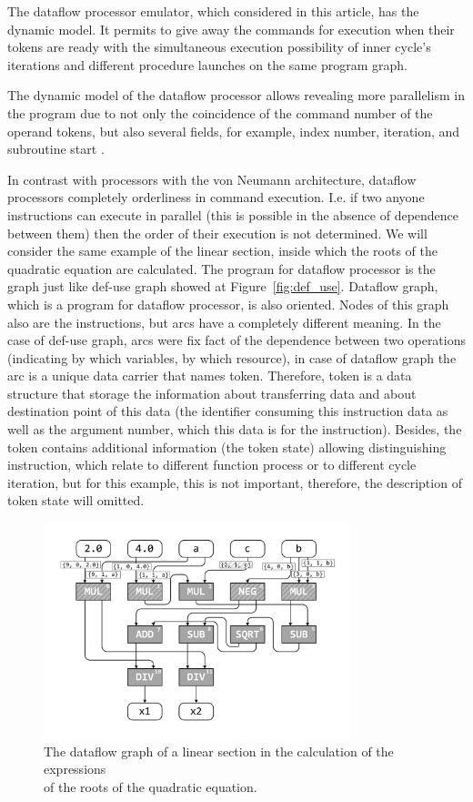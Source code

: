 \documentclass[
11pt,%
tightenlines,%
twoside,%
onecolumn,%
nofloats,%
nobibnotes,%
nofootinbib,%
superscriptaddress,%
noshowpacs,%
centertags]%
{revtex4}
\begin{document}
The dataflow processor emulator, which considered in this article, has the dynamic model.
It permits to give away the commands for execution when their tokens are ready with the simultaneous execution possibility of inner cycle’s iterations and different procedure launches on the same program graph.

The dynamic model of the dataflow processor allows revealing more parallelism in the program due to not only the coincidence of the command number of the operand tokens, but also several fields, for example, index number, iteration, and subroutine start \cite{Wiley}.

In contrast with processors with the von Neumann architecture, dataflow processors completely orderliness in command execution.
I.e. if two anyone instructions can execute in parallel (this is possible in the absence of dependence between them) then the order of their execution is not determined.
We will consider the same example of the linear section, inside which the roots of the quadratic equation are calculated.
The program for dataflow processor is the graph just like def-use graph showed at Figure~\ref{fig:def_use}.
Dataflow graph, which is a program for dataflow processor, is also oriented.
Nodes of this graph also are the instructions, but arcs have a completely different meaning.
In the case of def-use graph, arcs were fix fact of the dependence between two operations (indicating by which variables, by which resource), in case of dataflow graph the arc is a unique data carrier that names token.
Therefore, token is a data structure that storage the information about transferring data and about destination point of this data (the identifier consuming this instruction data as well as the argument number, which this data is for the instruction).
Besides, the token contains additional information (the token state) allowing distinguishing instruction, which relate to different function process or to different cycle iteration, but for this example, this is not important, therefore, the description of token state will omitted.

\begin{figure}[h]
\setcaptionmargin{5mm}
\onelinecaptionsfalse %
\includegraphics[width=0.80\textwidth]{pics/dataflow.pdf}
\caption{The dataflow graph of a linear section in the calculation of the expressions \\ of the roots of the quadratic equation.}\label{fig:dataflow}
\end{figure}
\end{document}
